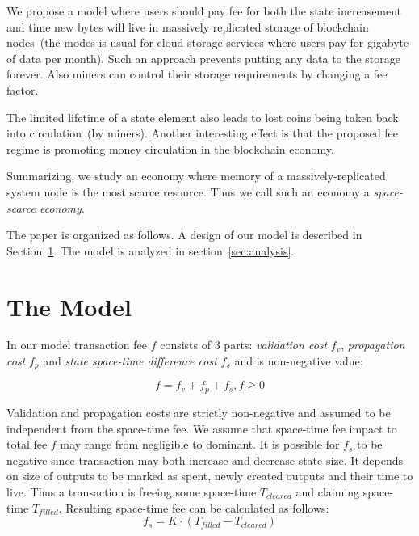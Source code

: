 \documentclass[]{article}   %
\newcommand{\authnote}[2]{\marginpar{\parbox{\marginparwidth}{\tiny %
  \textsf{#1 {\textcolor{blue}{notes: #2}}}}}%
  \textcolor{blue}{\textbf{\dag}}}
\newcommand{\authnote}[2]{
  \textsf{#1 \textcolor{blue}{: #2}}}
\newcommand{\authnote}[2]{}
\newcommand{\knote}[1]{{\authnote{\textcolor{green}{Alex notes}}{#1}}}
\begin{document}
We propose a model where users should pay fee for both the state increasement and time new bytes will live in massively replicated storage of blockchain nodes~(the modes is usual for cloud storage services where users pay for gigabyte of data per month). Such an approach prevents putting any data to the storage forever. Also miners can control their storage requirements by changing a fee factor. 

The limited lifetime of a state element also leads to lost coins being taken back into circulation~(by miners). Another interesting effect is that the proposed fee regime is promoting money circulation in the blockchain economy.

Summarizing, we study an economy where memory of a massively-replicated system node is the most scarce resource. Thus we call such an economy a \textit{space-scarce economy}.  

The paper is organized as follows. A design of our model is described in Section~\ref{sec:model}. The model is analyzed in section~\ref{sec:analysis}.  \knote{finish}

\knote{note that we're talking about minimal fees}

\section{The Model}
\label{sec:model}

In our model transaction fee $f$ consists of 3 parts: \textit{validation cost} $f_v$, \textit{propagation cost} $f_p$ and \textit{state space-time difference cost} $f_s$ and is non-negative value:

\begin{equation}
f = f_v + f_p + f_s , f \ge 0
\end{equation}

Validation and propagation costs are strictly non-negative and assumed to be independent from the space-time fee. We assume that space-time fee impact to total fee $f$ may range from negligible to dominant. It is possible for $f_s$ to be negative since transaction may both increase and decrease state size. It depends on size of outputs to be marked as spent, newly created outputs and their time to live. Thus a transaction is freeing some space-time \textit{$T_{cleared}$} and claiming space-time \textit{$T_{filled}$}. Resulting space-time fee can be calculated as follows:
\begin{equation}
f_s = K \cdot (T_{filled} - T_{cleared})
\end{equation}
\end{document}
